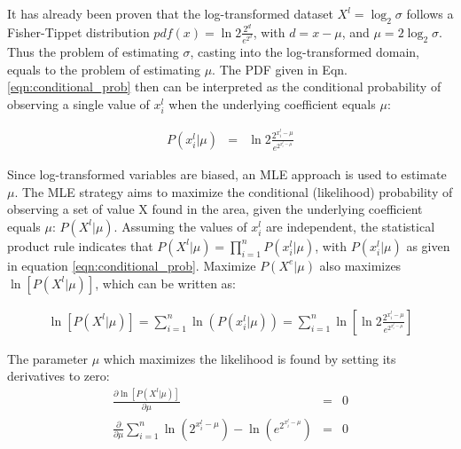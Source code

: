 It has already been proven that the log-transformed dataset $X^l=\log_2 \sigma$ follows a Fisher-Tippet distribution $pdf(x)= \ln 2 \frac{ 2^d }{ e^{2^d} }$, with $d=x-\mu$, and $\mu=2 \log_2 \sigma$. 
Thus the problem of estimating $\sigma$, casting into the log-transformed domain, equals to the problem of estimating $\mu$. 
The PDF given in Eqn. \ref{eqn:conditional_prob} then can be interpreted as
  the conditional probability of observing a single value of $x^l_i$ when the underlying coefficient equals $\mu$: %

\begin{eqnarray}
\label{eqn:conditional_prob}
P(x^l_i | \mu ) 
	&=& \ln 2 \frac{ 2^{x^l_i - \mu} }{ e^{2^{ x^l_i -\mu }} }
\end{eqnarray}

Since log-transformed variables are biased, an MLE approach is used to estimate $\mu$. 
The MLE strategy aims to maximize the conditional (likelihood) probability of observing a set of value X found in the area, given the underlying coefficient equals $\mu$: $P(X^l | \mu )$. 
Assuming the values of $x^l_i$ are independent, the statistical product rule indicates that $P(X^l | \mu )=\displaystyle{\prod^n_{i=1}{P(x^l_i | \mu ) }}$, with  $P(x^l_i | \mu)$ as given in equation \ref{eqn:conditional_prob}.   
Maximize $P(X^e | \mu )$ also maximizes $\ln[P(X^l | \mu )]$, which can be written as:

\begin{eqnarray}
\ln[P(X^l | \mu )] 
	= \displaystyle{\sum^n_{i=1}{ \ln(P(x^l_i | \mu )) }} 
	= \displaystyle{\sum^n_{i=1}{ \ln \left[ \ln 2 \frac{ 2^{x^l_i - \mu} }{ e^{2^{ x^l_i -\mu }} } \right] }} 
\end{eqnarray}

The parameter $\mu$ which maximizes the likelihood is found by setting its derivatives to zero:
\begin{eqnarray}
\displaystyle{ \frac{ \partial{ \ln[P( X^l | \mu )] }  }{\partial{ \mu }} }
	&=& 0 \\
\displaystyle{ \frac{ \partial }{\partial{ \mu }} \sum^n_{i=1}{ \ln( 2^{x^l_i - \mu}) - \ln( e^{2^{ x^l_i -\mu }} ) } }
	&=& 0 
\end{eqnarray}


